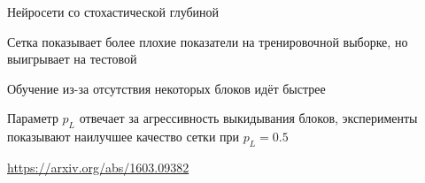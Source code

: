 \documentclass[notes,12pt, aspectratio=169]{beamer}
\newenvironment{wideitemize}{\itemize\addtolength{\itemsep}{10pt}}{\enditemize}
\begin{document}
\begin{frame}{Нейросети со стохастической глубиной}
\begin{wideitemize}
	\item  Сетка показывает более плохие показатели на тренировочной выборке, но выигрывает на тестовой
	
	\item Обучение из-за отсутствия некоторых блоков идёт быстрее
	
	\item Параметр $p_L$ отвечает за агрессивность выкидывания блоков, эксперименты показывают наилучшее качество сетки при $p_L = 0.5$
\end{wideitemize}

\vfill %
\footnotesize 
\color{blue} \url{https://arxiv.org/abs/1603.09382}
\end{frame}
\end{document}
